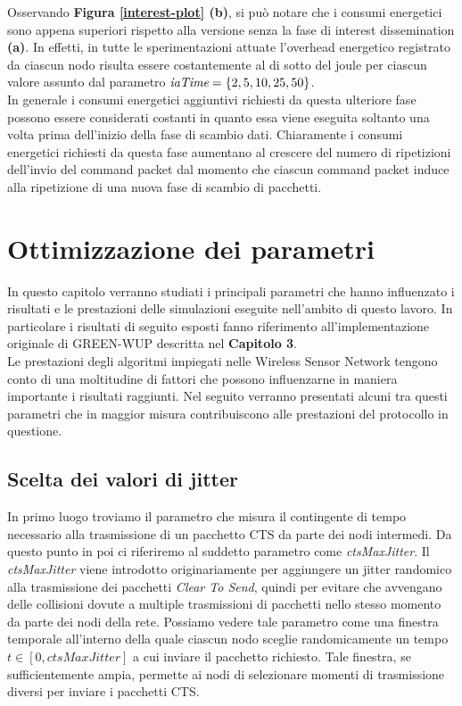 \documentclass[binding=0.6cm,TFA]{sapthesis}
\begin{document}
Osservando \textbf{Figura \ref{interest-plot} (b)}, si può notare che i consumi energetici sono appena superiori rispetto alla versione senza la fase di interest dissemination
\textbf{(a)}. In effetti, in tutte le sperimentazioni attuate l'overhead energetico registrato da ciascun nodo risulta essere costantemente al di sotto del
joule per ciascun valore assunto dal parametro $\emph{iaTime}=\{2,5,10,25,50\}$.\\

In generale i consumi energetici aggiuntivi richiesti da questa ulteriore fase possono essere considerati costanti in quanto essa viene eseguita soltanto una
volta prima dell'inizio della fase di scambio dati. Chiaramente i consumi energetici richiesti da questa fase aumentano al crescere del
numero di ripetizioni dell'invio del command packet dal momento che ciascun command packet induce alla ripetizione di una
nuova fase di scambio di pacchetti.\\

\chapter{Ottimizzazione dei parametri}

In questo capitolo verranno studiati i principali parametri che hanno influenzato i risultati e le prestazioni delle simulazioni eseguite nell'ambito di
questo lavoro. In particolare i risultati di seguito esposti fanno riferimento all'implementazione originale di GREEN-WUP descritta nel \textbf{Capitolo 3}.\\

Le prestazioni degli algoritmi impiegati nelle Wireless Sensor Network tengono conto di una moltitudine di fattori che possono influenzarne in
maniera importante i risultati raggiunti. Nel seguito verranno presentati alcuni tra questi parametri che in maggior misura contribuiscono alle
prestazioni del protocollo in questione.

\section{Scelta dei valori di jitter}

In primo luogo troviamo il parametro che misura il contingente di tempo necessario alla trasmissione di un pacchetto CTS da parte dei nodi intermedi. Da
questo punto in poi ci riferiremo al suddetto parametro come \emph{ctsMaxJitter}. Il \emph{ctsMaxJitter} viene introdotto originariamente per
aggiungere un jitter randomico alla trasmissione dei pacchetti \emph{Clear To Send}, quindi per evitare che avvengano delle collisioni dovute a multiple
trasmissioni di pacchetti nello stesso momento da parte dei nodi della rete. Possiamo vedere tale parametro come una finestra temporale all'interno
della quale ciascun nodo sceglie randomicamente un tempo $t \in [0, ctsMaxJitter]$ a cui inviare il pacchetto richiesto. Tale finestra, se sufficientemente
ampia, permette ai nodi di selezionare momenti di trasmissione diversi per inviare i pacchetti CTS.\\
\end{document}

